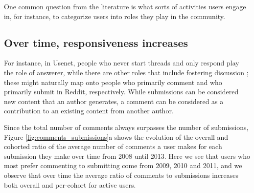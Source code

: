 \begin{figure*}[!tb]
\centering
{}
\caption{Figure (a) shows the average comment per submission ratio over clock time and Figure (b) from the user-referential time. Both figures show the cohorted trends and the overall users trends. Figure (c), similarly to Figure \ref{fig:avr_posts_per_user_for_surviving_year}, shows the 2008, 2009, 2010, and 2011 cohorts, segmented by the number of years a user in the cohort survived.  As with average posts per month, users who stay active longer appear to start their careers with a relatively high comment-to-submission ratio than users who abandon Reddit sooner.  Unlike that analysis, however, the early 2008 cohort ends up below the later cohorts.}
\label{fig:comments_submissions}
\end{figure*}

One common question from the literature is what sorts of activities users engage in, for instance, to categorize users into roles they play in the community\cite{welser 2011 wikipedia roles paper from iconference}.  

\subsection{Over time, responsiveness increases}
For instance, in Usenet, people who never start threads and only respond play the role of answerer, while there are other roles that include fostering discussion \cite{http://www.cmu.edu/joss/content/articles/volume8/Welser/}; these might naturally map onto people who primarily comment and who primarily submit in Reddit, respectively.  While submissions can be considered new content that an author generates, a comment can be considered as a contribution to an existing content from another author.

Since the total number of comments always surpasses the number of submissions, Figure \ref{fig:comments_submissions}a shows the evolution of the overall and cohorted ratio of the average number of comments a user makes for each submission they make over time from 2008 until 2013. Here we see that users who most prefer commenting to submitting come from 2009, 2010 and 2011, and we observe that over time the average ratio of comments to submissions increases both overall and per-cohort for active users.

